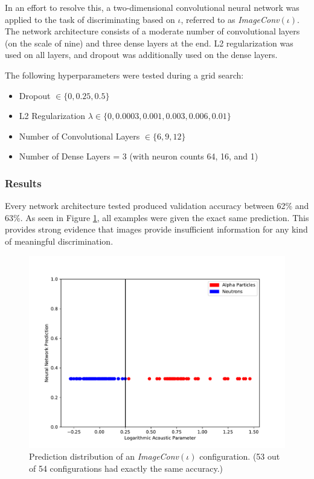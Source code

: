\documentclass[10pt]{article}
\begin{document}
In an effort to resolve this, a two-dimensional convolutional neural network was applied to the task of discriminating based on $\iota$, referred to as {\it ImageConv}$(\iota)$. The network architecture consists of a moderate number of convolutional layers (on the scale of nine) and three dense layers at the end. L2 regularization was used on all layers, and dropout was additionally used on the dense layers.

The following hyperparameters were tested during a grid search:
\begin{itemize}
    \item Dropout $\in \{0, 0.25, 0.5\}$
    \item L2 Regularization $\lambda \in \{0, 0.0003, 0.001, 0.003, 0.006, 0.01\}$
    \item Number of Convolutional Layers $\in \{6, 9, 12\}$
    \item Number of Dense Layers = 3 (with neuron counts 64, 16, and 1)
\end{itemize}

\subsubsection{Results}

Every network architecture tested produced validation accuracy between 62\% and 63\%. As seen in Figure \ref{image_hist}, all examples were given the exact same prediction. This provides strong evidence that images provide insufficient information for any kind of meaningful discrimination.

\begin{figure}[h]
    \centering
    \includegraphics[width=\textwidth]{image_hist}
    \caption{\label{image_hist} Prediction distribution of an {\it ImageConv}$(\iota)$ configuration. (53 out of 54 configurations had exactly the same accuracy.)}
\end{figure}
\end{document}
